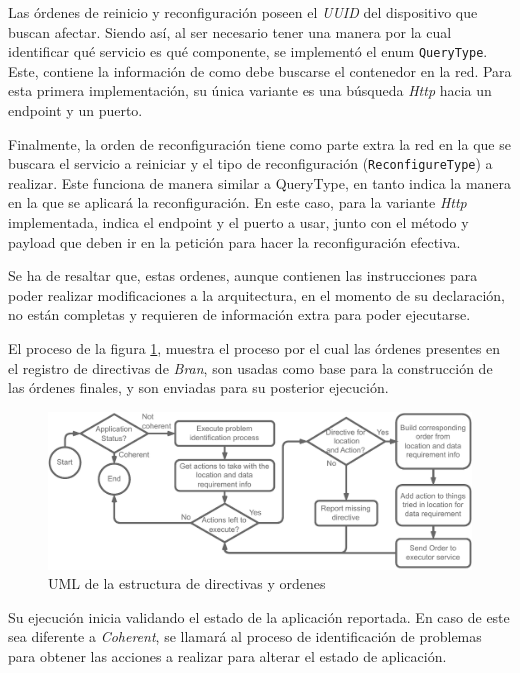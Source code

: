 Las órdenes de reinicio y reconfiguración poseen el \textit{UUID} del dispositivo que buscan afectar. Siendo así, al ser necesario tener una manera por la cual identificar qué servicio es qué componente, se implementó el enum \texttt{QueryType}. Este, contiene la información de como debe buscarse el contenedor en la red. Para esta primera implementación, su única variante es una búsqueda \textit{Http} hacia un endpoint y un puerto.

Finalmente, la orden de reconfiguración tiene como parte extra la red en la que se buscara el servicio a reiniciar y el tipo de reconfiguración (\texttt{ReconfigureType}) a realizar. Este funciona de manera similar a QueryType, en tanto indica la manera en la que se aplicará la reconfiguración. En este caso, para la variante \textit{Http} implementada, indica el endpoint y el puerto a usar, junto con el método y payload que deben ir en la petición para hacer la reconfiguración efectiva.

Se ha de resaltar que, estas ordenes, aunque contienen las instrucciones para poder realizar modificaciones a la arquitectura, en el momento de su declaración, no están completas y requieren de información extra para poder ejecutarse.

El proceso de la figura \ref{fig:BranExecution}, muestra el proceso por el cual las órdenes presentes en el registro de directivas de \textit{Bran}, son usadas como base para la construcción de las órdenes finales, y son enviadas para su posterior ejecución.

\begin{figure}[ht]
    \centering
    \caption{UML de la estructura de directivas y ordenes}
    \label{fig:BranExecution}
    \includegraphics[width=0.9\linewidth]{images/BranProcessExecuter.pdf}
\end{figure}

Su ejecución inicia validando el estado de la aplicación reportada. En caso de este sea diferente a \textit{Coherent}, se llamará al proceso de identificación de problemas para obtener las acciones a realizar para alterar el estado de aplicación.

